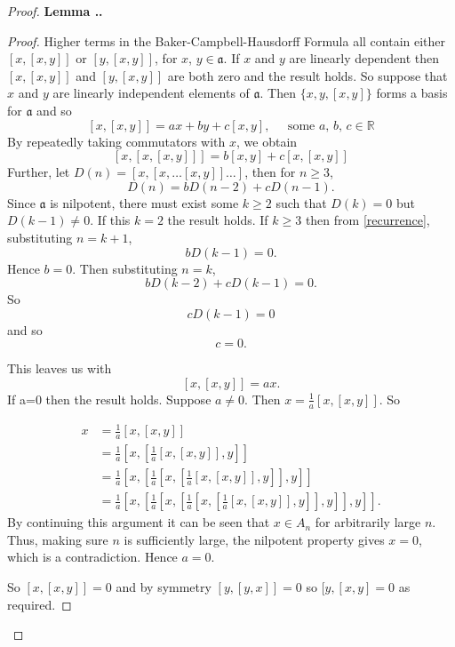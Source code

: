 \documentclass[honours]{UNSWthesis}
\newcommand{\R}{\mathbb{R}}
\newcommand{\1}{\mathbf{e}_{1}}
\newcommand{\2}{\mathbf{e}_{3}}
\newcommand{\3}{\mathbf{e}_{3}}
\newcounter{Item}[section]
\newenvironment{Lemma}{\medskip
                            \refstepcounter{Item}
                            \noindent
                           {\bf Lemma \thesection.\theItem.}\ %
                            \begingroup \sl}
                           {\endgroup\medskip}
\begin{document}
\begin{proof}
\begin{Lemma}
\begin{proof} 
Higher terms in the Baker-Campbell-Hausdorff Formula all contain either $[x,[x,y]]$ or $[y,[x,y]]$, for $x$, $y \in \mathfrak{a}$. If $x$ and $y$ are linearly dependent then $[x,[x,y]]$ and $[y,[x,y]]$ are both zero and the result holds. So suppose that $x$ and $y$ are linearly independent elements of $\mathfrak{a}$. Then $\{x,y,[x,y]\}$ forms a basis for $\mathfrak{a}$ and so
\[
[x,[x,y]]=ax+by+c[x,y], \;\;\;\;\; \text{some $a$, $b$, $c \in \R$}
\]
By repeatedly taking commutators with $x$, we obtain
\[
[x,[x,[x,y]]]=b[x,y]+c[x,[x,y]]
\]
Further, let $D(n)=[x,[x,\ldots[x,y]] \ldots ]$, then for $n \geq 3$,
\begin{equation}\label{recurrence}
D(n)=bD(n-2)+cD(n-1).
\end{equation}
Since $\mathfrak{a}$ is nilpotent, there must exist some $k \geq 2$ such that $D(k)=0$ but $D(k-1) \neq 0$. If this $k=2$ the result holds. If $k \geq 3$ then from \ref{recurrence}, substituting $n=k+1$,
\[
bD(k-1)=0
.\] Hence $b=0$.
Then substituting $n=k$,
\[
bD(k-2)+cD(k-1)=0
.\] So
\[
cD(k-1)=0
\] and so
\[
c=0.
\]

This leaves us with 
\[
[x,[x,y]]=ax.
\]
If a=0 then the result holds. Suppose $a \neq 0$. Then $x=\frac{1}{a}[x,[x,y]]$. So

\begin{align*}
x &= \frac{1}{a}[x,[x,y]] \\
&= \frac{1}{a}[x,[\frac{1}{a}[x,[x,y]],y]] \\
&=\frac{1}{a}[x,[\frac{1}{a}[x,[\frac{1}{a}[x,[x,y]],y]],y]] \\
&=\frac{1}{a}[x,[\frac{1}{a}[x,[\frac{1}{a}[x,[\frac{1}{a}[x,[x,y]],y]],y]],y]].
\end{align*}
By continuing this argument it can be seen that $x \in A_{n}$ for arbitrarily large $n$. Thus, making sure $n$ is sufficiently large, the nilpotent property gives $x=0$, which is a contradiction. Hence $a=0$.

So $[x,[x,y]]=0$ and by symmetry $[y,[y,x]]=0$ so $[y,[x,y]=0$ as required.
\end{proof}


\end{Lemma}
\end{proof}
\end{document}
